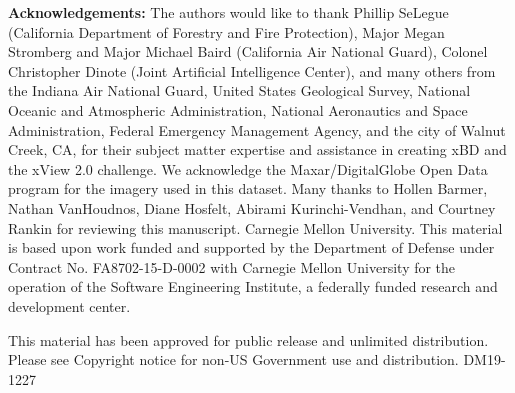\documentclass[10pt,twocolumn,letterpaper]{article}
\begin{document}
\vspace{1em}
\noindent \textbf{Acknowledgements:} The authors would like to thank Phillip SeLegue (California Department of Forestry and Fire Protection), Major Megan Stromberg and Major Michael Baird (California Air National Guard), Colonel Christopher Dinote (Joint Artificial Intelligence Center), and many others from the Indiana Air National Guard, United States Geological Survey, National Oceanic and Atmospheric Administration, National Aeronautics and Space Administration, Federal Emergency Management Agency, and the city of Walnut Creek, CA, for their subject matter expertise and assistance in creating xBD and the xView 2.0 challenge. We acknowledge the Maxar/DigitalGlobe Open Data program for the imagery used in this dataset.
Many thanks to Hollen Barmer, Nathan VanHoudnos, Diane Hosfelt, Abirami Kurinchi-Vendhan, and Courtney Rankin for reviewing this manuscript.
\vspace{\baselineskip}\linebreak
\noindent {} Carnegie Mellon University. This material is based upon work funded and supported by the Department of Defense under Contract No. FA8702-15-D-0002 with Carnegie Mellon University for the operation of the Software Engineering Institute, a federally funded research and development center.

 This material has been approved for public release and unlimited distribution.  Please see Copyright notice for non-US Government use and distribution.
DM19-1227


{\small
	
	
}
	
\end{document}
